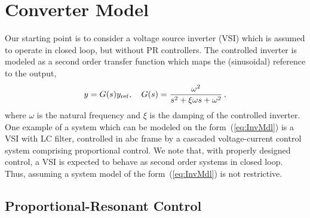 \documentclass[conference,10pt]{IEEEtran}
\begin{document}
\section{Converter Model}
\label{sec:conmod}
%

Our starting point is to consider a voltage source inverter (VSI) which is assumed to operate in closed loop, but without PR controllers.  The controlled inverter is modeled as a second order transfer function which maps the (sinusoidal) reference to the output,
\begin{align}
\label{eq:InvMdl}
y = G(s)y_{\rm ref},\quad G(s) = \frac{\omega^2}{s^2+\xi\omega s + \omega^2}\,,
\end{align}
where $\omega$ is the natural frequency and $\xi$ is the damping of the controlled inverter. One example of a system which can be modeled on the form~(\ref{eq:InvMdl}) is a VSI with LC filter, %
controlled in abc frame by a cascaded voltage-current control system comprising proportional control.
We note that, with properly designed control, a VSI is expected to behave as second order systems in closed loop. Thus, assuming a system model of the form~(\ref{eq:InvMdl}) is not restrictive.



\subsection{Proportional-Resonant Control}
\end{document}
